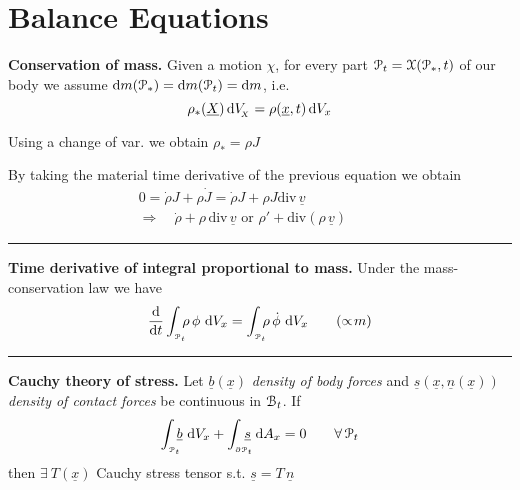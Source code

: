 

\section{\texorpdfstring{\color{red}Balance Equations}{}}


\textbf{Conservation of mass.} Given a motion $\chi$, for every part $\EuScript{P}_t=\EuScript{X}(\EuScript{P}_*,t)$ of our body we assume $\mathrm{d} m(\EuScript{P}_*)=\mathrm{d} m(\EuScript{P}_t)=\mathrm{d} m$, i.e.
\begin{equation*}
\rho_*(\underline{X})\, \mathrm{d} V_{\!_X} = \rho(\underline{x},t)\, \mathrm{d} V_x
\end{equation*}

Using a change of var. we obtain $\boxed{\rho_*=\rho J}$

\smallskip

By taking the material time derivative of the previous equation we obtain
\begin{gather*}
0=\dot{\rho}J+\rho \dot{J}=\dot{\rho}J+\rho J \text{div}\,\underline{v} \\
\Longrightarrow\quad\boxed{\dot{\rho}+\rho\,\text{div}\,\underline{v}}\text{ or }\boxed{\rho'+\text{div}(\rho\, \underline{v})}\qquad\ \ 
\end{gather*}

\rule{0.31\textwidth}{0.2pt}
\smallskip

\textbf{Time derivative of integral proportional to mass.} Under the mass-conservation law we have
\begin{equation*}
\frac{\mathrm{d}}{\mathrm{d} t}\int_{_{\EuScript{P}_t}}\!\!\!  \rho\,\phi\ \mathrm{d} V_{x}=\int_{_{\EuScript{P}_t}}\!\!\!  \rho\,\dot{\phi}\ \mathrm{d} V_{x} \tag{$\propto\!m$}
\end{equation*}

\rule{0.31\textwidth}{0.2pt}
\smallskip

\textbf{Cauchy theory of stress.} Let $\underline{b}(\underline{x})$ \emph{density of body forces} and $\underline{s}(\underline{x},\underline{n}(\underline{x}))$ \emph{density of contact forces} be continuous in $\EuScript{B}_t$. If
\begin{equation*}
\int_{_{\pt_t}}\!\!\! \underline{b}\ \de V_{x}+\int_{_{\partial \pt_t}}\!\!\!\!\! \underline{s}\ \de A_x=0 \qquad \forall\, \pt_t
\end{equation*}
then $\exists\ T(\underline{x})$ Cauchy stress tensor s.t. $\boxed{\underline{s}=T\, \underline{n}}$

